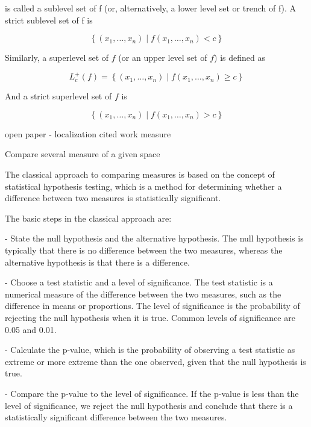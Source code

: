 \documentclass[12pt]{article} %
\theoremstyle{plain}
\begin{document}
	
	
	is called a sublevel set of f (or, alternatively, a lower level set or trench of f). A strict sublevel set of f is
	
	\begin{equation}
		\left\{(x_{1},\dots ,x_{n})\mid f(x_{1},\dots ,x_{n})<c\right\}
	\end{equation}
	
	Similarly, a superlevel set of $f$ (or an upper level set of $f$) is defined as
	
	\begin{equation}
	L_{c}^{+}(f)=\left\{(x_{1},\dots ,x_{n})\mid f(x_{1},\dots ,x_{n})\geq c\right\}
	\end{equation}

	And a strict superlevel set of $f$ is
	
	\begin{equation}
		\left\{(x_{1},\dots ,x_{n})\mid f(x_{1},\dots ,x_{n})>c\right\}
	\end{equation}

	
	
	open paper - localization cited work measure 
	
	Compare several measure of a given space
	
	
	
	The classical approach to comparing measures is based on the concept of statistical hypothesis testing, which is a method for determining whether a difference between two measures is statistically significant.
	
	The basic steps in the classical approach are:
	
	- State the null hypothesis and the alternative hypothesis. The null hypothesis is typically that there is no difference between the two measures, whereas the alternative hypothesis is that there is a difference.
	
	- Choose a test statistic and a level of significance. The test statistic is a numerical measure of the difference between the two measures, such as the difference in means or proportions. The level of significance is the probability of rejecting the null hypothesis when it is true. Common levels of significance are 0.05 and 0.01.
	
	- Calculate the p-value, which is the probability of observing a test statistic as extreme or more extreme than the one observed, given that the null hypothesis is true.
	
	- Compare the p-value to the level of significance. If the p-value is less than the level of significance, we reject the null hypothesis and conclude that there is a statistically significant difference between the two measures.
	
\end{document}
